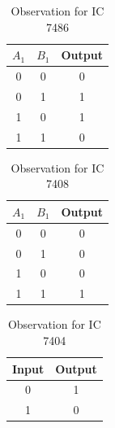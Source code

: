 \documentclass[11pt, a4paper]{article}
\begin{document}
\begin{minipage}[t]{0.48\textwidth}

\begin{table}[H]
    \centering
    \caption{Observation for IC 7486}
    \begin{tabular}{|c|c|c|}
        \hline
        $A_1$ & $B_1$ & Output \\
        \hline
        0 & 0 & 0 \\
        \hline
        0 & 1 & 1 \\
        \hline
        1 & 0 & 1 \\
        \hline
        1 & 1 & 0 \\
        \hline
    \end{tabular}
\end{table}

\begin{table}[H]
    \centering
    \caption{Observation for IC 7408}
    \begin{tabular}{|c|c|c|}
        \hline
        $A_1$ & $B_1$ & Output \\
        \hline
        0 & 0 & 0 \\
        \hline
        0 & 1 & 0 \\
        \hline
        1 & 0 & 0 \\
        \hline
        1 & 1 & 1 \\
        \hline
    \end{tabular}
\end{table}

\begin{table}[H]
    \centering
    \caption{Observation for IC 7404}
    \begin{tabular}{|c|c|}
        \hline
        Input & Output \\
        \hline
        0 & 1 \\
        \hline
        1 & 0 \\
        \hline
    \end{tabular}
\end{table}

\end{minipage}
\hfill
\end{document}
